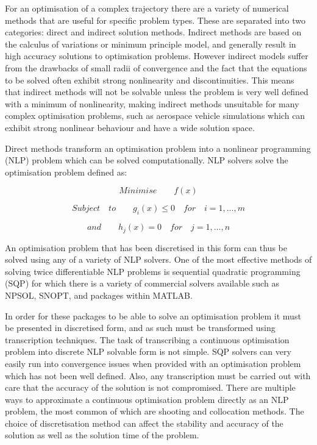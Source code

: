 For an optimisation of a complex trajectory there are a variety of numerical methods that are useful for specific problem types. These are separated into two categories: direct and indirect solution methods\cite{Betts1998}. Indirect methods are based on the calculus of variations or minimum principle model, and generally result in high accuracy solutions to optimisation problems\cite{Bulirsch1993}. However indirect models suffer from the drawbacks of small radii of convergence and the fact that the equations to be solved often exhibit strong nonlinearity and discontinuities. This means that indirect methods will not be solvable unless the problem is very well defined with a minimum of nonlinearity, making indirect methods unsuitable for many complex optimisation problems, such as aerospace vehicle simulations which can exhibit strong nonlinear behaviour and have a wide solution space. 

Direct methods transform an optimisation problem into a nonlinear programming (NLP) problem which can be solved computationally\cite{Stryk1992}. NLP solvers solve the optimisation problem defined as\cite{Bazaraa2013}:

\begin{equation}
Minimise \qquad f(x)
\end{equation}

\begin{equation}
Subject \quad to \qquad g_i(x)\leq0 \quad for \quad i=1,...,m
\end{equation}

\begin{equation}
and \qquad h_j(x) = 0 \quad for \quad j=1,...,n
\end{equation}

An optimisation problem that has been discretised in this form can thus be solved using any of a variety of NLP solvers. One of the most effective methods of solving twice differentiable NLP problems is sequential quadratic programming (SQP)\cite{Boggs2000} for which there is a variety of commercial solvers available such as NPSOL, SNOPT, and packages within MATLAB. 

In order for these packages to be able to solve an optimisation problem it must be presented in discretised form, and as such must be transformed using transcription techniques\cite{Kelly2015}. The task of transcribing a continuous optimisation problem into discrete NLP solvable form is not simple. SQP solvers can very easily run into convergence issues when provided with an optimisation problem which has not been well defined. Also, any transcription must be carried out with care that the accuracy of the solution is not compromised. 
There are multiple ways to approximate a continuous optimisation problem directly as an NLP problem, the most common of which are shooting and collocation methods. The choice of discretisation method can affect the stability and accuracy of the solution as well as the solution time of the problem. 

